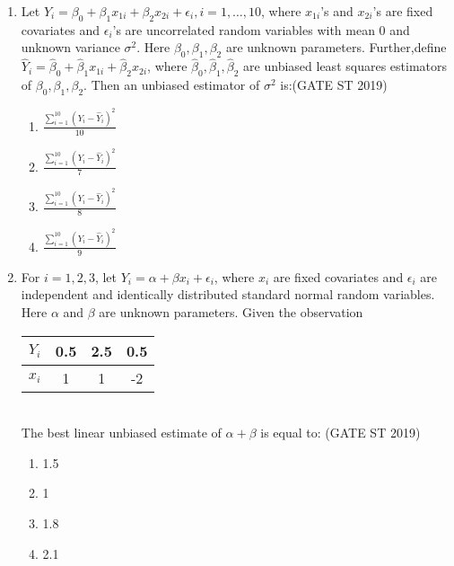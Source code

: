 \documentclass[journal]{IEEEtran}
\begin{document}
\begin{enumerate}[start=1]
\item Let \(Y_i = \beta_0 + \beta_1 x_{1i} + \beta_2 x_{2i} + \epsilon_i, i = 1, \ldots, 10\), where \(x_{1i}\)'s and \(x_{2i}\)'s are fixed covariates and \(\epsilon_i\)'s are uncorrelated random variables with mean 0 and unknown variance \(\sigma^2\). Here \(\beta_0, \beta_1, \beta_2\) are unknown parameters. Further,define \(\hat{Y}_i = \hat{\beta}_0 + \hat{\beta}_1 x_{1i} + \hat{\beta}_2 x_{2i}\), where \(\hat{\beta}_0, \hat{\beta}_1, \hat{\beta}_2\) are unbiased least squares estimators of \(\beta_0, \beta_1, \beta_2\). Then an unbiased estimator of \(\sigma^2\) is:\hfill(GATE ST 2019)
\begin{multicols}{2}
\begin{enumerate}
\item \(\frac{\sum_{i=1}^{10} (Y_i - \hat{Y}_i)^2}{10}\)
\item \(\frac{\sum_{i=1}^{10} (Y_i - \hat{Y}_i)^2}{7}\)
\item \(\frac{\sum_{i=1}^{10} (Y_i - \hat{Y}_i)^2}{8}\)
\item \(\frac{\sum_{i=1}^{10} (Y_i - \hat{Y}_i)^2}{9}\)
\end{enumerate}
\end{multicols}

\item For \(i = 1, 2, 3\), let \(Y_i = \alpha + \beta x_i + \epsilon_i\), where \(x_i\) are fixed covariates and \(\epsilon_i\) are independent and identically distributed standard normal random variables. Here \(\alpha\) and \(\beta\) are unknown parameters. Given the observation \\
\begin{tabular}{|c|c|c|c|}
\hline
$Y_i$ & 0.5 & 2.5 & 0.5 \\
\hline
$x_i$ & 1   & 1   & -2  \\
\hline
\end{tabular}\\
The best linear unbiased estimate of \(\alpha + \beta\) is equal to: \hfill(GATE ST 2019)
\begin{multicols}{4}
\begin{enumerate}
\item 1.5
\item 1
\item 1.8
\item 2.1
\end{enumerate}
\end{multicols}


\end{enumerate}
\end{document}
